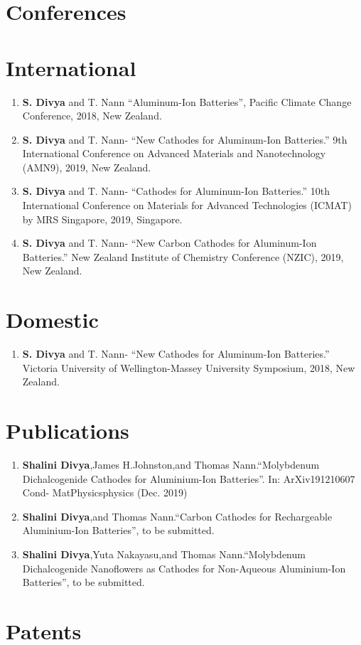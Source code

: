 \section*{\centering Conferences}
\section*{International}
\begin{enumerate}
    \item \textbf{S. Divya} and T. Nann \enquote{Aluminum-Ion Batteries}, Pacific Climate Change Conference, 2018, New Zealand.
    \item \textbf{S. Divya} and T. Nann- \enquote{New Cathodes for Aluminum-Ion Batteries.} 9th International Conference on Advanced Materials and Nanotechnology (AMN9), 2019, New Zealand.
    \item \textbf{S. Divya} and T. Nann- \enquote{Cathodes for Aluminum-Ion Batteries.} 10th International Conference on Materials for Advanced Technologies (ICMAT) by MRS Singapore, 2019, Singapore.
     \item \textbf{S. Divya} and T. Nann- \enquote{New Carbon Cathodes for Aluminum-Ion Batteries.} New Zealand Institute of Chemistry Conference (NZIC), 2019, New Zealand.
\end{enumerate}
\section*{Domestic}   
\begin{enumerate}
     \item \textbf{S. Divya} and T. Nann- \enquote{New Cathodes for Aluminum-Ion Batteries.} Victoria University of Wellington-Massey University Symposium, 2018, New Zealand.
\end{enumerate}

\section*{\centering Publications}
\begin{enumerate}
    \item \textbf{Shalini Divya},James H.Johnston,and Thomas Nann.“Molybdenum Dichalcogenide Cathodes for Aluminium-Ion Batteries”. In: ArXiv191210607 Cond- MatPhysicsphysics (Dec. 2019) %
    \item \textbf{Shalini Divya},and Thomas Nann.“Carbon Cathodes for Rechargeable Aluminium-Ion Batteries”, to be submitted.
    \item \textbf{Shalini Divya},Yuta Nakayasu,and Thomas Nann.“Molybdenum Dichalcogenide Nanoflowers as Cathodes for Non-Aqueous Aluminium-Ion Batteries”, to be submitted.
\end{enumerate}
\section*{\centering Patents}
